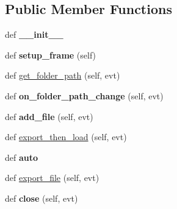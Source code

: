 \subsection*{Public Member Functions}
\begin{DoxyCompactItemize}
\item 
\hypertarget{class_uni_dec_1_1import__wizard_1_1_import_wizard_af3794424db3ccd37b1ce46ff74e22237}{}def {\bfseries \+\_\+\+\_\+init\+\_\+\+\_\+}\label{class_uni_dec_1_1import__wizard_1_1_import_wizard_af3794424db3ccd37b1ce46ff74e22237}

\item 
\hypertarget{class_uni_dec_1_1import__wizard_1_1_import_wizard_a421eaa4d5335e45b52a95ddf7dd0c89d}{}def {\bfseries setup\+\_\+frame} (self)\label{class_uni_dec_1_1import__wizard_1_1_import_wizard_a421eaa4d5335e45b52a95ddf7dd0c89d}

\item 
def \hyperlink{class_uni_dec_1_1import__wizard_1_1_import_wizard_a33e938d5cb0f6e4196ddf79a0d05ca8b}{get\+\_\+folder\+\_\+path} (self, evt)
\item 
\hypertarget{class_uni_dec_1_1import__wizard_1_1_import_wizard_a479cbf706652bc0c5518dd8c0adce7ee}{}def {\bfseries on\+\_\+folder\+\_\+path\+\_\+change} (self, evt)\label{class_uni_dec_1_1import__wizard_1_1_import_wizard_a479cbf706652bc0c5518dd8c0adce7ee}

\item 
\hypertarget{class_uni_dec_1_1import__wizard_1_1_import_wizard_a70a95bffdb6891ece4bfd27921b9978c}{}def {\bfseries add\+\_\+file} (self, evt)\label{class_uni_dec_1_1import__wizard_1_1_import_wizard_a70a95bffdb6891ece4bfd27921b9978c}

\item 
def \hyperlink{class_uni_dec_1_1import__wizard_1_1_import_wizard_a479ed3812053fe687a811b640c724681}{export\+\_\+then\+\_\+load} (self, evt)
\item 
\hypertarget{class_uni_dec_1_1import__wizard_1_1_import_wizard_ad141f39dd10cc20ef89f7bef552c26a8}{}def {\bfseries auto}\label{class_uni_dec_1_1import__wizard_1_1_import_wizard_ad141f39dd10cc20ef89f7bef552c26a8}

\item 
def \hyperlink{class_uni_dec_1_1import__wizard_1_1_import_wizard_a986de263af707160d4b7e3427e555b3b}{export\+\_\+file} (self, evt)
\item 
\hypertarget{class_uni_dec_1_1import__wizard_1_1_import_wizard_a23bdb87d7f3ab201631c430f906dbfdf}{}def {\bfseries close} (self, evt)\label{class_uni_dec_1_1import__wizard_1_1_import_wizard_a23bdb87d7f3ab201631c430f906dbfdf}

\end{DoxyCompactItemize}
